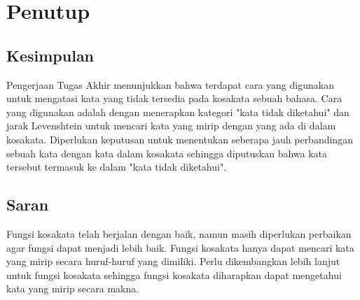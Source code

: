 \chapter{Penutup}

\section{Kesimpulan}

Pengerjaan Tugas Akhir menunjukkan bahwa terdapat cara yang digunakan untuk mengatasi kata yang tidak tersedia pada kosakata sebuah bahasa. Cara yang digunakan adalah dengan menerapkan kategori "kata tidak diketahui" dan jarak Levenshtein untuk mencari kata yang mirip dengan yang ada di dalam kosakata. Diperlukan keputusan untuk menentukan seberapa jauh perbandingan sebuah kata dengan kata dalam kosakata sehingga diputuskan bahwa kata tersebut termasuk ke dalam "kata tidak diketahui".

\section{Saran}

Fungsi kosakata telah berjalan dengan baik, namun masih diperlukan perbaikan agar fungsi dapat menjadi lebih baik. Fungsi kosakata hanya dapat mencari kata yang mirip secara huruf-huruf yang dimiliki. Perlu dikembangkan lebih lanjut untuk fungsi kosakata sehingga fungsi kosakata diharapkan dapat mengetahui kata yang mirip secara makna.